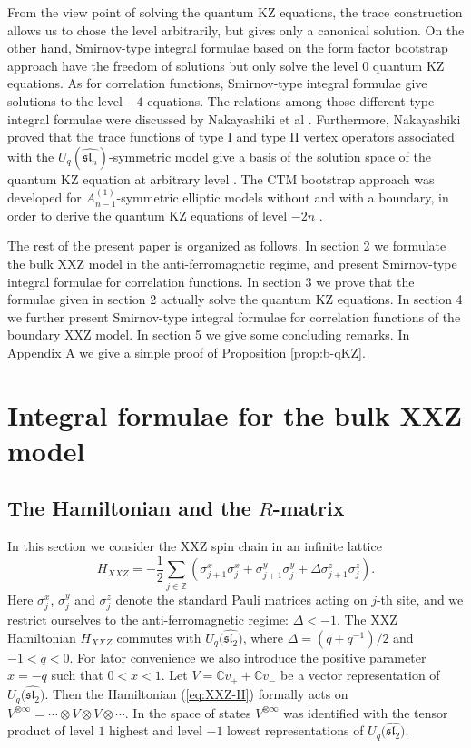 \documentclass[a4paper,10pt]{article}
\begin{document}
From the view point of solving the quantum KZ equations, 
the trace construction allows us to chose the level 
arbitrarily, but gives only a canonical solution. 
On the other hand, Smirnov-type integral 
formulae based on the form factor bootstrap approach have 
the freedom of solutions but only solve the level $0$ quantum 
KZ equations. As for correlation functions, Smirnov-type 
integral formulae give solutions to the level $-4$ equations. 
The relations among those different type integral formulae 
were discussed by Nakayashiki et al \cite{NPT}. Furthermore, 
Nakayashiki proved that the trace functions of type I and 
type II vertex operators associated with the 
$U_q (\widehat{\mathfrak{sl}_n})$-symmetric model 
give a basis of the solution space of the quantum KZ equation 
at arbitrary level \cite{N1}. The CTM bootstrap approach 
was developed for $A^{(1)}_{n-1}$-symmetric elliptic models 
without and with a boundary, in order to derive the quantum 
KZ equations of level $-2n$ \cite{SPn,bBela,bJMO}. 

The rest of the present paper is organized as follows. 
In section 2 we formulate the bulk XXZ model in the 
anti-ferromagnetic regime, and present Smirnov-type integral 
formulae for correlation functions. In section 3 we prove 
that the formulae given in section 2 actually solve the quantum 
KZ equations. In section 4 we further present Smirnov-type 
integral formulae for correlation functions of the boundary 
XXZ model. In section 5 we give some concluding remarks. 
In Appendix A we give a simple proof of Proposition 
\ref{prop:b-qKZ}. 

\section{Integral formulae for the bulk XXZ model}

\subsection{The Hamiltonian and the $R$-matrix} 

In this section we consider the XXZ spin chain 
in an infinite lattice 
\begin{equation}
H_{XXZ}=-\frac{1}{2}\sum_{j\in\mathbb{Z}} 
(\sigma_{j+1}^x \sigma_{j}^x + \sigma_{j+1}^y 
\sigma_{j}^y +\Delta \sigma_{j+1}^z \sigma_{j}^z). 
\label{eq:XXZ-H}
\end{equation}
Here $\sigma_{j}^x$, $\sigma_{j}^y$ and $\sigma_{j}^z$ 
denote the standard Pauli matrices acting on $j$-th site, 
and we 
restrict ourselves to the anti-ferromagnetic regime: 
$\Delta <-1$. 
The XXZ Hamiltonian $H_{XXZ}$ commutes with 
$U_q \bigl( \widehat{\mathfrak{sl}_2}\bigr)$, where 
$\Delta=(q+q^{-1})/2$ and $-1<q<0$. For lator convenience 
we also introduce the positive parameter $x=-q$ such that 
$0<x<1$. Let $V=\mathbb{C}v_+ +\mathbb{C}v_-$ be a vector 
representation 
of $U_q \bigl( \widehat{\mathfrak{sl}_2}\bigr)$. Then 
the Hamiltonian (\ref{eq:XXZ-H}) formally acts on 
$V^{\otimes \infty}=\cdots \otimes V\otimes V\otimes 
\cdots$. In \cite{JMbk} the space of states 
$V^{\otimes \infty}$ was identified with the tensor 
product of level $1$ highest and level $-1$ lowest 
representations of 
$U_q \bigl( \widehat{\mathfrak{sl}_2}\bigr)$. 
\end{document}
